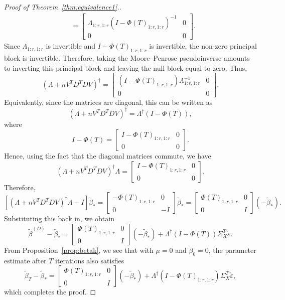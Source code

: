 \documentclass[11pt]{article}
\begin{document}
\begin{proof}[Proof of Theorem~\ref{thm:equivalence1}.]
\begin{align*}
    &= \begin{bmatrix}
        \Lambda_{1:r,1:r} (I - \Phi(T)_{1:r, 1:r})^{-1} & 0 \\ 0 & 0
    \end{bmatrix}.
\end{align*}
Since $\Lambda_{1:r,1:r}$ is invertible and $I-\Phi(T)_{1:r,1:r}$ is invertible, the non-zero principal block is invertible. Therefore, taking the Moore--Penrose pseudoinverse amounts to inverting this principal block and leaving the null block equal to zero. Thus,
\[ 
    \left(\Lambda + n V^T D^T D V \right)^{\dagger} = \begin{bmatrix} (I-\Phi(T)_{1:r,1:r})\Lambda_{1:r,1:r}^{-1} & 0 \\ 0 & 0 \end{bmatrix}. 
\] 
Equivalently, since the matrices are diagonal, this can be written as 
\[ 
    \left(\Lambda + n V^T D^T D V \right)^{\dagger} = \Lambda^\dagger (I-\Phi(T)), \] where \[ I-\Phi(T) = \begin{bmatrix} I-\Phi(T)_{1:r,1:r} & 0 \\ 0 & 0 \end{bmatrix}. 
\] 
Hence, using the fact that the diagonal matrices commute, we have
\[ 
    \left(\Lambda + n V^T D^T D V \right)^{\dagger}\Lambda = \begin{bmatrix} I-\Phi(T)_{1:r,1:r} & 0 \\ 0 & 0 \end{bmatrix}. 
\] 
Therefore, 
\[ 
    \left[ \left(\Lambda + n V^T D^T D V \right)^{\dagger}\Lambda - I \right]\tilde{\beta}_* = \begin{bmatrix} -\Phi(T)_{1:r,1:r} & 0 \\ 0 & -I \end{bmatrix} \tilde{\beta}_* = \begin{bmatrix} \Phi(T)_{1:r,1:r} & 0 \\ 0 & I \end{bmatrix} (-\tilde{\beta}_*).
\]
Substituting this back in, we obtain
\[
    \tilde{\beta}^{(D)} - \tilde{\beta}_* = \begin{bmatrix} \Phi(T)_{1:r,1:r} & 0 \\ 0 & I \end{bmatrix} (-\tilde{\beta}_*) + \Lambda^\dagger (I-\Phi(T)) \Sigma_X^T \check{\varepsilon}. 
\]
From Proposition~\ref{prop:betak}, we see that with $\mu = 0$ and $\beta_0 = 0$, the parameter estimate after $T$ iterations also satisfies
\[
    \tilde{\beta}_T - \tilde{\beta}_* = \begin{bmatrix} \Phi(T)_{1:r, 1:r} & 0 \\ 0 & I \end{bmatrix}(-\tilde{\beta}_*) + \Lambda^{\dagger} (I - \Phi(T)_{1:r, 1:r})\Sigma_X^T\check{\varepsilon},
\]
which completes the proof.
\end{proof}
\end{document}
